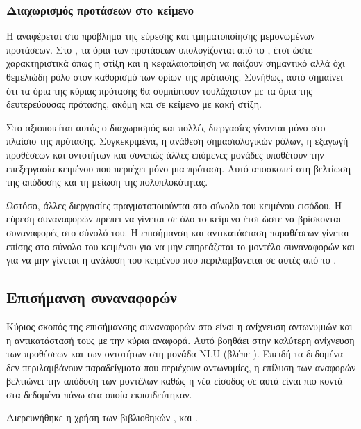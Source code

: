 \subsubsection{Διαχωρισμός προτάσεων στο κείμενο}\label{subsec:4-sents}
Η  αναφέρεται στο πρόβλημα της εύρεσης και τμηματοποίησης μεμονωμένων προτάσεων.
Στο , τα όρια των προτάσεων υπολογίζονται από το ,
έτσι ώστε χαρακτηριστικά όπως η στίξη και η κεφαλαιοποίηση να παίζουν σημαντικό αλλά όχι θεμελιώδη ρόλο στον καθορισμό των ορίων της πρότασης.
Συνήθως, αυτό σημαίνει ότι τα όρια της κύριας πρότασης θα συμπίπτουν τουλάχιστον με τα όρια της δευτερεύουσας πρότασης, ακόμη και σε κείμενο με κακή στίξη.

Στο \projectname{} αξιοποιείται αυτός ο διαχωρισμός και πολλές διεργασίες γίνονται μόνο στο πλαίσιο της πρότασης.
Συγκεκριμένα, η ανάθεση σημασιολογικών ρόλων, η εξαγωγή προθέσεων και οντοτήτων και συνεπώς άλλες επόμενες μονάδες υποθέτουν την επεξεργασία κειμένου που περιέχει μόνο μια πρόταση.
Αυτό αποσκοπεί στη βελτίωση της απόδοσης και τη μείωση της πολυπλοκότητας.

Ωστόσο, άλλες διεργασίες πραγματοποιούνται στο σύνολο του κειμένου εισόδου.
Η εύρεση συναναφορών πρέπει να γίνεται σε όλο το κείμενο έτσι ώστε να βρίσκονται συναναφορές στο σύνολό του.
Η επισήμανση και αντικατάσταση παραθέσεων γίνεται επίσης στο σύνολο του κειμένου για να μην επηρεάζεται το μοντέλο συναναφορών
και για να μην γίνεται η ανάλυση του κειμένου που περιλαμβάνεται σε αυτές από το .

\subsection{Επισήμανση συναναφορών}\label{subsec:4-coref-resolution}
Κύριος σκοπός της επισήμανσης συναναφορών στο \projectname{} είναι η ανίχνευση αντωνυμιών και η αντικατάστασή τους με την κύρια αναφορά.
Αυτό βοηθάει στην καλύτερη ανίχνευση των προθέσεων και των οντοτήτων στη μονάδα NLU (βλέπε ).
Επειδή τα δεδομένα δεν περιλαμβάνουν παραδείγματα που περιέχουν αντωνυμίες,
η επίλυση των αναφορών βελτιώνει την απόδοση των μοντέλων καθώς η νέα είσοδος σε αυτά είναι πιο κοντά στα δεδομένα πάνω στα οποία εκπαιδεύτηκαν.

Διερευνήθηκε η χρήση των βιβλιοθηκών ,  και .


